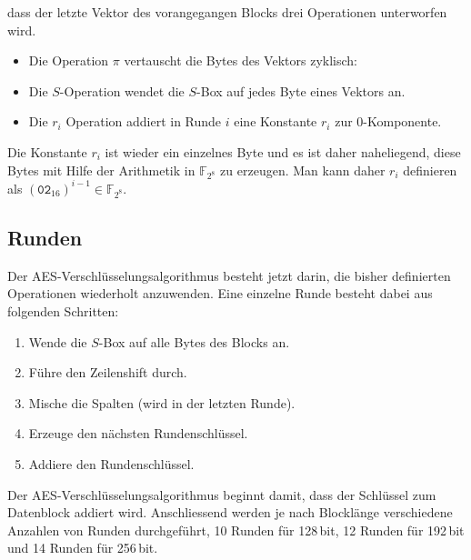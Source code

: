 dass der letzte Vektor des vorangegangen Blocks drei Operationen
unterworfen wird.
\begin{itemize}
\item
Die Operation $\pi$ vertauscht die Bytes des Vektors zyklisch:
\begin{center}
\end{center}
\item
Die $S$-Operation wendet die $S$-Box auf jedes Byte eines Vektors an.
\item
Die $r_i$ Operation addiert in Runde $i$ eine Konstante $r_i$ zur
$0$-Komponente.
\end{itemize}
Die Konstante $r_i$ ist wieder ein einzelnes Byte und es ist daher
naheliegend, diese Bytes mit Hilfe der Arithmetik in $\mathbb{F}_{2^8}$
zu erzeugen.
Man kann daher $r_i$ definieren als
$(\texttt{02}_{16})^{i-1}\in\mathbb{F}_{2^8}$.

\subsection{Runden}
Der AES-Verschlüsselungsalgorithmus besteht jetzt darin, die bisher
definierten Operationen wiederholt anzuwenden.
Eine einzelne Runde besteht dabei aus folgenden Schritten:
\begin{enumerate}
\item Wende die $S$-Box auf alle Bytes des Blocks an.
\item Führe den Zeilenshift durch.
\item Mische die Spalten (wird in der letzten Runde).
\item Erzeuge den nächsten Rundenschlüssel.
\item Addiere den Rundenschlüssel.
\end{enumerate}
Der AES-Verschlüsselungsalgorithmus beginnt damit, dass der Schlüssel
zum Datenblock addiert wird.
Anschliessend werden je nach Blocklänge verschiedene Anzahlen von
Runden durchgeführt, 10 Runden für 128\,bit, 12 Runden für 192\,bit und
14 Runden für 256\,bit.





